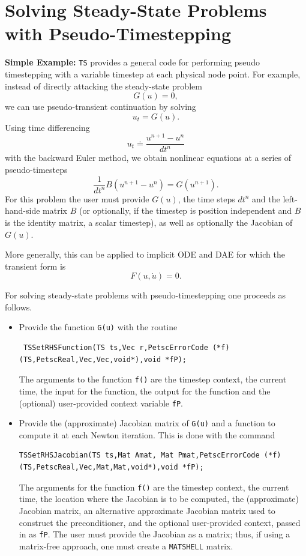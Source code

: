 \vspace{.2cm}

\cleardoublepage
\chapter{Solving Steady-State Problems with Pseudo-Timestepping}

\vspace{.2cm}

\noindent
{\bf Simple Example:}
\lstinline{TS} provides a general code for performing pseudo timestepping
with a variable timestep at each physical node point. For example, instead of
directly attacking the steady-state problem
\[
           G(u) = 0,
\]
we can use pseudo-transient continuation by solving
\[
           u_t = G(u).
\]
Using time differencing
\[
   u_t \doteq \frac{{u^{n+1}} - {u^{n}} }{dt^{n}}
\]
with the backward Euler method, we obtain
nonlinear equations at a series of pseudo-timesteps
\[
           \frac{1}{dt^n} B (u^{n+1} - u^{n} ) = G(u^{n+1}).
\]
For this problem the user must provide $G(u)$,
the time steps $dt^{n}$ and the left-hand-side matrix $B$
(or optionally, if the timestep is position independent and $B$ is the
identity matrix,
a scalar timestep), as well as optionally the Jacobian of $G(u)$.

More generally, this can be applied to implicit ODE and DAE for which
the transient form is
\[
  F(u,\dot{u}) = 0.
\]

For solving steady-state problems with pseudo-timestepping one proceeds
as follows.
\begin{itemize}
\item Provide the function \lstinline{G(u)} with the routine
\begin{lstlisting}
 TSSetRHSFunction(TS ts,Vec r,PetscErrorCode (*f)(TS,PetscReal,Vec,Vec,void*),void *fP);
\end{lstlisting}
The  arguments to the function \lstinline{f()} are
the timestep context, the current time, the input for the function,
the output for the function and the (optional) user-provided context
variable \lstinline{fP}.

\item Provide the (approximate) Jacobian matrix of \lstinline{G(u)} and a
function to compute it at each Newton iteration. This is done with the command
\begin{lstlisting}
TSSetRHSJacobian(TS ts,Mat Amat, Mat Pmat,PetscErrorCode (*f)(TS,PetscReal,Vec,Mat,Mat,void*),void *fP);
\end{lstlisting}
The  arguments for the function \lstinline{f()} are
the timestep context, the current time, the location where the
Jacobian is to be computed, the (approximate) Jacobian matrix, an alternative
approximate Jacobian matrix used to construct the preconditioner, and the optional
user-provided context, passed in as \lstinline{fP}. The user must provide the
Jacobian as a matrix; thus, if using a matrix-free approach, one
must create a \lstinline{MATSHELL} matrix.
\end{itemize}

